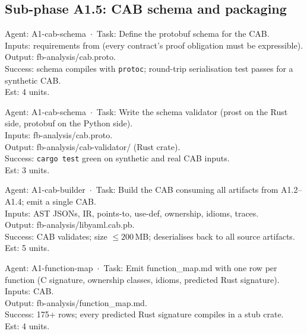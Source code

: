 \documentclass[12pt]{article}
\theoremstyle{definition}
\theoremstyle{remark}
\newenvironment{tasklist}{%
  \begingroup\raggedright
  \begin{description}[style=nextline, leftmargin=1.8cm, itemsep=0.4em]
}{%
  \end{description}
  \endgroup
}
\begin{document}
\subsection{Sub-phase A1.5: CAB schema and packaging}

\begin{tasklist}

\item[T21.] {\ttfamily [~] Agent: A1-cab-schema~$\cdot$~Task: Define the protobuf schema for the CAB.}\\
Inputs: requirements from  (every contract's proof obligation must be expressible).\\
Output: fb-analysis/cab.proto.\\
Success: schema compiles with \verb|protoc|; round-trip serialisation test passes for a synthetic CAB.\\
Est: 4 units.

\item[T22.] {\ttfamily [~] Agent: A1-cab-schema~$\cdot$~Task: Write the schema validator (prost on the Rust side, protobuf on the Python side).}\\
Inputs: fb-analysis/cab.proto.\\
Output: fb-analysis/cab-validator/ (Rust crate).\\
Success: \verb|cargo test| green on synthetic and real CAB inputs.\\
Est: 3 units.

\item[T23.] {\ttfamily [~] Agent: A1-cab-builder~$\cdot$~Task: Build the CAB consuming all artifacts from A1.2--A1.4; emit a single CAB.}\\
Inputs: AST JSONs, IR, points-to, use-def, ownership, idioms, traces.\\
Output: fb-analysis/libyaml.cab.pb.\\
Success: CAB validates; size $\leq 200$\,MB; deserialises back to all source artifacts.\\
Est: 5 units.

\item[T24.] {\ttfamily [~] Agent: A1-function-map~$\cdot$~Task: Emit function\_map.md with one row per function (C signature, ownership classes, idioms, predicted Rust signature).}\\
Inputs: CAB.\\
Output: fb-analysis/function\_map.md.\\
Success: 175+ rows; every predicted Rust signature compiles in a stub crate.\\
Est: 4 units.


\end{tasklist}
\end{document}
